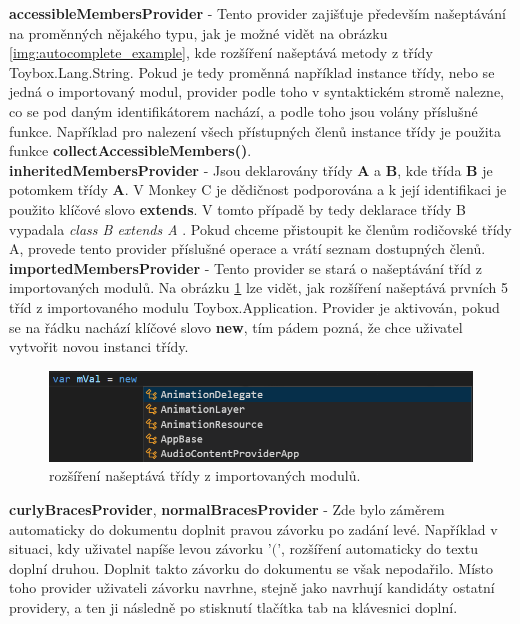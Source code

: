 \textbf{accessibleMembersProvider} - Tento provider zajišťuje především našeptávání na proměnných nějakého typu, jak je možné vidět na obrázku \ref{img:autocomplete_example}, kde rozšíření našeptává metody z třídy Toybox.Lang.String. Pokud je tedy proměnná například instance třídy, nebo se jedná o importovaný modul, provider podle toho v syntaktickém stromě nalezne, co se pod daným identifikátorem nachází, a podle toho jsou volány příslušné funkce. Například pro nalezení všech přístupných členů instance třídy je použita funkce \textbf{collectAccessibleMembers()}.\\

\textbf{inheritedMembersProvider} - Jsou deklarovány třídy \textbf{A} a \textbf{B}, kde třída \textbf{B} je potomkem třídy \textbf{A}. V Monkey C je dědičnost podporována a k její identifikaci je použito klíčové slovo \textbf{extends}. V tomto případě by tedy deklarace třídy B vypadala \textit{class B extends A {}}. Pokud chceme přistoupit ke členům rodičovské třídy A, provede tento provider příslušné operace a vrátí seznam dostupných členů.\\

\textbf{importedMembersProvider} - Tento provider se stará o našeptávání tříd z importovaných modulů. Na obrázku \ref{img:importedModules} lze vidět, jak rozšíření našeptává prvních 5 tříd z importovaného modulu Toybox.Application. Provider je aktivován, pokud se na řádku nachází klíčové slovo \textbf{new}, tím pádem pozná, že chce uživatel vytvořit novou instanci třídy.\\


\begin{figure}[b!]
	\centering
	\includegraphics[width=\textwidth,scale=1]{images/importedModules}
	\caption{rozšíření našeptává třídy z importovaných modulů.}
	\label{img:importedModules}
\end{figure}

\textbf{curlyBracesProvider}, \textbf{normalBracesProvider} - Zde bylo záměrem automaticky do dokumentu doplnit pravou závorku po zadání levé. Například v situaci, kdy uživatel napíše levou závorku '\textbf{$($}', rozšíření automaticky do textu doplní druhou. Doplnit takto závorku do dokumentu se však nepodařilo. Místo toho provider uživateli závorku navrhne, stejně jako navrhují kandidáty ostatní providery, a ten ji následně po stisknutí tlačítka tab na klávesnici doplní.\\

